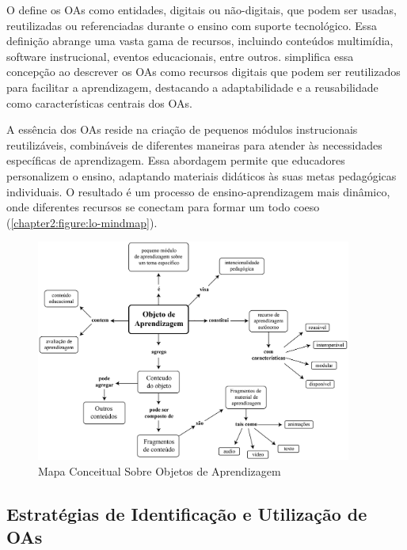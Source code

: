 
O  define os OAs como entidades, digitais ou não-digitais, que podem ser usadas, reutilizadas ou referenciadas durante o ensino com suporte tecnológico. Essa definição abrange uma vasta gama de recursos, incluindo conteúdos multimídia, software instrucional, eventos educacionais, entre outros.  simplifica essa concepção ao descrever os OAs como recursos digitais que podem ser reutilizados para facilitar a aprendizagem, destacando a adaptabilidade e a reusabilidade como características centrais dos OAs.

A essência dos OAs reside na criação de pequenos módulos instrucionais reutilizáveis, combináveis de diferentes maneiras para atender às necessidades específicas de aprendizagem. Essa abordagem permite que educadores personalizem o ensino, adaptando materiais didáticos às suas metas pedagógicas individuais. O resultado é um processo de ensino-aprendizagem mais dinâmico, onde diferentes recursos se conectam para formar um todo coeso (\autoref{chapter2:figure:lo-mindmap}).

\begin{figure}[htb]
\centering
\caption{Mapa Conceitual Sobre Objetos de Aprendizagem}
\label{chapter2:figure:lo-mindmap}
\includegraphics[width=0.925\textwidth]{images/chapter2-lo-mindmap.jpg}
\end{figure}

\subsection{Estratégias de Identificação e Utilização de OAs}

